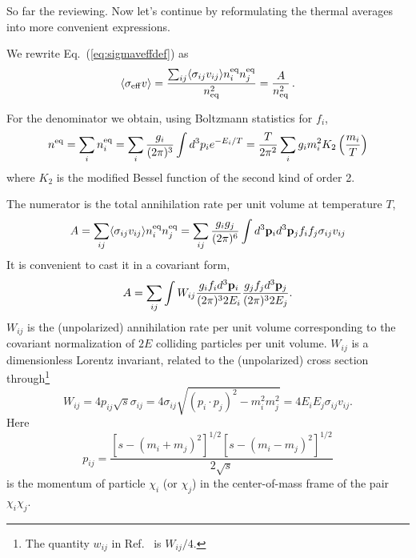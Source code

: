 So far the reviewing. Now let's continue
by reformulating the thermal averages into
more convenient expressions. 

We rewrite Eq.~(\ref{eq:sigmaveffdef}) as
\begin{equation} \label{eq:sigmaveff}
  \langle \sigma_{\rm{eff}} v \rangle = \frac{ \sum_{ij} \langle
  \sigma_{ij}v_{ij} \rangle n_{i}^{\rm{eq}} n_{j}^{\rm{eq}}}{n^2_{\rm{eq}}}
  = 
  \frac{A}{n_{\rm{eq}}^2} \, .
\end{equation}

For the denominator we obtain, 
using Boltzmann statistics for $f_i$,
\begin{equation} \label{eq:neq}
  n^{\rm eq} = \sum_i n^{\rm eq}_i = 
  \sum_i \frac{g_i}{(2\pi)^3} \int d^3 p_i 
  e^{-E_{i}/T} = 
  \frac{T}{2\pi^2} \sum_i g_i m_{i}^2
  K_{2} \left( \frac{m_{i}}{T}\right)
\end{equation}
where $K_{2}$ is the modified Bessel function of the second kind of 
order 2.

The numerator is the total annihilation rate per unit volume
at temperature $T$,
\begin{equation} 
  A = \sum_{ij} \langle \sigma_{ij} v_{ij} \rangle n_i^{\rm eq}
  n_j^{\rm eq} = \sum_{ij} \frac{g_{i}g_{j}}{(2\pi)^6} \int d^3 {\bf p}_{i}
  d^3{\bf p}_{j} f_{i}f_{j} \sigma_{ij} v_{ij}
\end{equation}
It is convenient
to cast it in a covariant form,
\begin{equation} 
  A = \sum_{ij} 
  \int W_{ij} \frac{g_i f_i d^3{\bf p}_i}{(2\pi)^3 2E_i}
  \frac{g_j f_j d^3{\bf p}_j}{(2\pi)^3 2E_j} .
\label{eq:Aij2}
\end{equation}
$W_{ij}$ is the (unpolarized) annihilation rate per unit volume
corresponding to the covariant normalization of $2E$ colliding
particles per unit volume. $W_{ij}$ is a dimensionless Lorentz
invariant, related to the (unpolarized) cross section
through\footnote{The quantity $w_{ij}$ in Ref.\ \protect\cite{SWO}
  is $W_{ij}/4$.}
\begin{equation} \label{eq:Wijcross}
  W_{ij} = 4 p_{ij} \sqrt{s} \sigma_{ij} = 4 \sigma_{ij} \sqrt{(p_i
\cdot p_j)^2 - m_i^2 m_j^2} = 4 E_{i} E_{j} \sigma_{ij} v_{ij} .
\end{equation}
Here
\begin{equation}
  p_{ij} =
\frac{\left[s-(m_i+m_j)^2\right]^{1/2}
\left[s-(m_i-m_j)^2\right]^{1/2}}{2\sqrt{s}}
\end{equation}
is the momentum of particle $\chi_i$ (or $\chi_j$) in the
center-of-mass frame of the pair $\chi_i\chi_j$.

